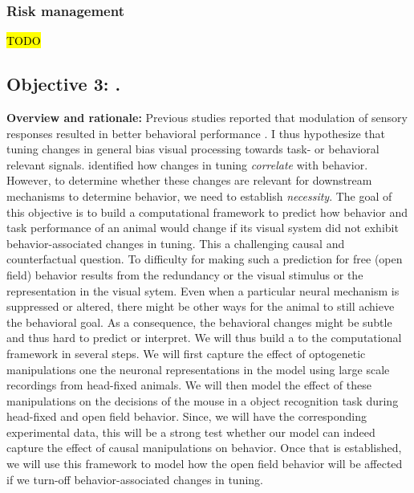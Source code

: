 \documentclass[B2,COG]{ercgrant}
\begin{document}
\subsubsection{Risk management} 
\hl{TODO}



\subsection{\colorbox{obj3}{\color{white}Objective 3}: \othreetitle .}
\label{sub:obj3}

\textbf{Overview and rationale:} 
Previous studies reported that modulation of sensory responses resulted in better behavioral performance \parencite{Spitzer1988-kq, Bennett2013-rk, Dadarlat2017-jw, De_Gee2022-ir}.
I thus hypothesize that tuning changes in general bias visual processing towards task- or behavioral relevant signals.
 identified how changes in tuning \textit{correlate} with behavior.
However, to determine whether these changes are relevant for downstream mechanisms to determine behavior, we need to establish \textit{necessity}. 
The goal of this objective is to build a computational framework to predict how behavior and task performance of an animal would change if its visual system did not exhibit behavior-associated changes in tuning. 
This a challenging causal and counterfactual question.
To difficulty for making such a prediction for free (open field) behavior results from the redundancy or the visual stimulus or the representation in the visual sytem. 
Even when a particular neural mechanism is suppressed or altered, there might be other ways for the animal to still achieve the behavioral goal. 
As a consequence, the behavioral changes might be subtle and thus hard to predict or interpret.
We will thus build a to the computational framework in several steps. 
We will first capture the effect of optogenetic manipulations one the neuronal representations in the model using large scale recordings from head-fixed animals. 
We will then model the effect of these manipulations on the decisions of the mouse in a object recognition task during head-fixed and open field behavior. 
Since, we will have the corresponding experimental data, this will be a strong test whether our model can indeed capture the effect of causal manipulations on behavior.
Once that is established, we will use this framework to model how the open field behavior will be affected if we turn-off behavior-associated changes in tuning.
\end{document}
